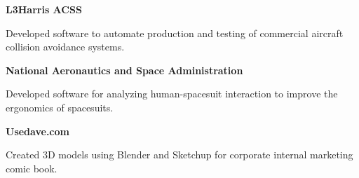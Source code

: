 \documentclass[letterpaper,ddMMMyyyy,nonstopmode]{simpleresumecv}
\newcommand{\descriptionWidth}{33em}
\newenvironment{Description}
{%
	\SmallGap
	\par
	\begin{Detail}
		\Item
		\begin{minipage}{\descriptionWidth}
}
{\par
\end{minipage}
\end{Detail}
}
\begin{document}
\begin{Body}
            \Entry\textbf{L3Harris ACSS}\hfill{}

                \begin{Description}
                    Developed software to automate production and testing of commercial aircraft collision avoidance systems.
                \end{Description}
            \Gap


            \Entry\textbf{National Aeronautics and Space Administration}\hfill{}\\

            \begin{Description}
                Developed software for analyzing human-spacesuit interaction to improve the ergonomics of spacesuits.
            \end{Description}
            \Gap

            \Entry\textbf{Usedave.com}\hfill{}

            \begin{Description}
                    Created 3D models using Blender and Sketchup for corporate internal marketing comic book.

            \end{Description}




\end{Body}
\end{document}
